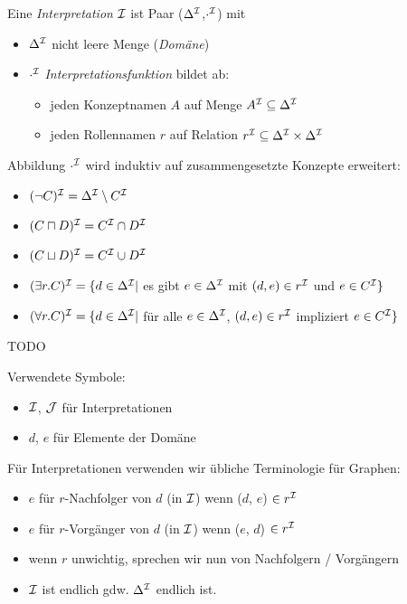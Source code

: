 \begin{definition}
Eine \emph{Interpretation} $\mathcal{I}$ ist Paar ($\Delta^{\mathcal{I}}$,$\cdot^{\mathcal{I}}$) mit
  \begin{itemize}
    \item{$\Delta^{\mathcal{I}}$ nicht leere Menge (\emph{Domäne})}
    \item{$\cdot^{\mathcal{I}}$ \emph{Interpretationsfunktion} bildet ab:
     \begin{itemize}
       \item{jeden Konzeptnamen $A$ auf Menge $A^{\mathcal{I}} \subseteq \Delta^{\mathcal{I}}$}
       \item{jeden Rollennamen $r$ auf Relation $r^{\mathcal{I}} \subseteq \Delta^{\mathcal{I}} \times \Delta^{\mathcal{I}}$}
     \end{itemize}}
  \end{itemize}

Abbildung $\cdot^{\mathcal{I}}$ wird induktiv auf zusammengesetzte Konzepte erweitert:
\begin{itemize}
  \item $(\neg C)^{\mathcal{I}} = \Delta^{\mathcal{I}} \setminus C^{\mathcal{I}}$
  \item $(C \sqcap D)^{\mathcal{I}} = C^{\mathcal{I}} \cap D^{\mathcal{I}}$
  \item $(C \sqcup D)^{\mathcal{I}} = C^{\mathcal{I}} \cup D^{\mathcal{I}}$
  \item $(\exists r.C)^{\mathcal{I}} = \{d \in \Delta^{\mathcal{I}} |$ es gibt $ e \in \Delta^{\mathcal{I}}$ mit $(d,e) \in r^{\mathcal{I}}$ und $e \in C^{\mathcal{I}}\}$
  \item $(\forall r.C)^{\mathcal{I}} = \{d \in \Delta^{\mathcal{I}} |$ für alle $ e \in \Delta^{\mathcal{I}}$, $(d,e) \in r^{\mathcal{I}}$ impliziert $e \in C^{\mathcal{I}}\}$
\end{itemize}
\end{definition}

\begin{tafel}
    TODO
\end{tafel}

Verwendete Symbole:

\begin{itemize}
  \item $\mathcal{I}$, $\mathcal{J}$ für Interpretationen
  \item $d$, $e$ für Elemente der Domäne
\end{itemize}

Für Interpretationen verwenden wir übliche Terminologie für Graphen:

\begin{itemize}
  \item $e$ für $r$-Nachfolger von $d$ (in $\mathcal{I}$) wenn ($d$, $e$) $\in r^{\mathcal{I}}$
  \item $e$ für $r$-Vorgänger von $d$ (in $\mathcal{I}$) wenn ($e$, $d$) $\in r^{\mathcal{I}}$
  \item wenn $r$ unwichtig, sprechen wir nun von Nachfolgern / Vorgängern
  \item $\mathcal{I}$ ist endlich gdw. $\Delta^{\mathcal{I}}$ endlich ist.
\end{itemize}

